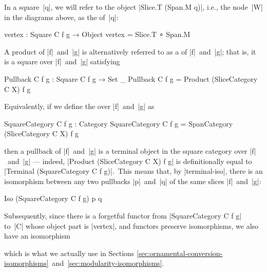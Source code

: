 In a square~|q|, we will refer to the object |Slice.T (Span.M q)|, i.e., the node~|W| in the diagrams above, as the  of~|q|:
\begin{code}
vertex : Square C f g → Object
vertex = Slice.T ∘ Span.M
\end{code}
A product of |f|~and~|g| is alternatively referred to as a  of |f|~and~|g|; that is, it is a square over |f|~and~|g| satisfying
\begin{code}
Pullback C f g : Square C f g → Set _
Pullback C f g = Product (SliceCategory C X) f g
\end{code}
Equivalently, if we define the  over |f|~and~|g| as
\begin{code}
SquareCategory C f g : Category
SquareCategory C f g = SpanCategory (SliceCategory C X) f g
\end{code}
then a pullback of |f|~and~|g| is a terminal object in the square category over |f|~and~|g| --- indeed, |Product (SliceCategory C X) f g| is definitionally equal to |Terminal (SquareCategory C f g)|.\
This means that, by |terminal-iso|, there is an isomorphism between any two pullbacks |p|~and~|q| of the same slices |f|~and~|g|:
\begin{code}
Iso (SquareCategory C f g) p q
\end{code}
Subsequently, since there is a forgetful functor from |SquareCategory C f g| to~|C| whose object part is |vertex|, and functors preserve isomorphisms, we also have an isomorphism
\begin{flalign}
&\hskip\mathindent |Iso C (vertex p) (vertex q)| &
\label{eq:vertex-iso}
\end{flalign}
which is what we actually use in Sections \ref{sec:ornamental-conversion-isomorphisms}~and~\ref{sec:modularity-isomorphisms}.


